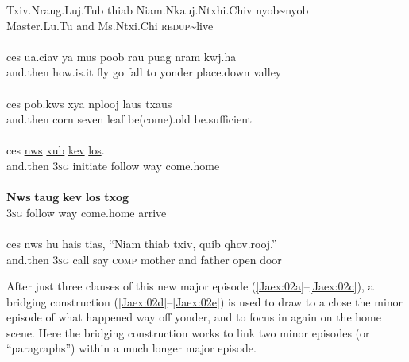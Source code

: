 \documentclass[output=paper]{LSP/langsci}
\begin{document}
\begin{exe}
\ex \label{Jaex:02af}
\begin{xlist}
\ex \label{Jaex:02a}
\gll Txiv.Nraug.Luj.Tub thiab Niam.Nkauj.Ntxhi.Chiv nyob{\textasciitilde}nyob\\
     Master.Lu.Tu       and   Ms.Ntxi.Chi \textsc{redup}{\textasciitilde}live\\
\glt {}\\
\ex \label{Jaex:02b}
\gll ces ua.ciav ya mus poob rau puag nram kwj.ha\\
and.then how.is.it fly go fall to yonder place.down valley\\ 
\glt {}\\
\ex \label{Jaex:02c}
\gll ces   pob.kws  xya  nplooj laus    txaus\\		
and.then  corn seven  leaf  be(come).old be.sufficient \\ 
\glt {}\\
\ex \label{Jaex:02d}
\gll ces \underline{nws} \underline{xub}  \underline{}  \underline{kev} \underline{los}.\\		           
and.then \textsc{3sg} initiate follow way come.home\\
\glt {}\\
\ex \label{Jaex:02e}
\gll \textbf{Nws} \textbf{taug} \textbf{kev} \textbf{los} \textbf{txog} \\		           
 \textsc{3sg} follow way come.home  arrive\\
\glt {}\\
\ex \label{Jaex:02f}
\gll ces   nws hu  hais tias, ``Niam  thiab txiv,  quib qhov.rooj.''\\     	      
and.then \textsc{3sg} call say \textsc{comp} mother and father open door\\
\glt {} \citep[][4]{johnson92}
\end{xlist}
\end{exe}

\noindent
After just three clauses of this new major episode (\ref{Jaex:02a}--\ref{Jaex:02c}), a bridging construction (\ref{Jaex:02d}--\ref{Jaex:02e}) is used to draw to a close the minor episode of what happened way off yonder, and to focus in again on the home scene. Here the bridging construction works to link two minor episodes (or ``paragraphs'') within a much longer major episode.
%
\end{document}
